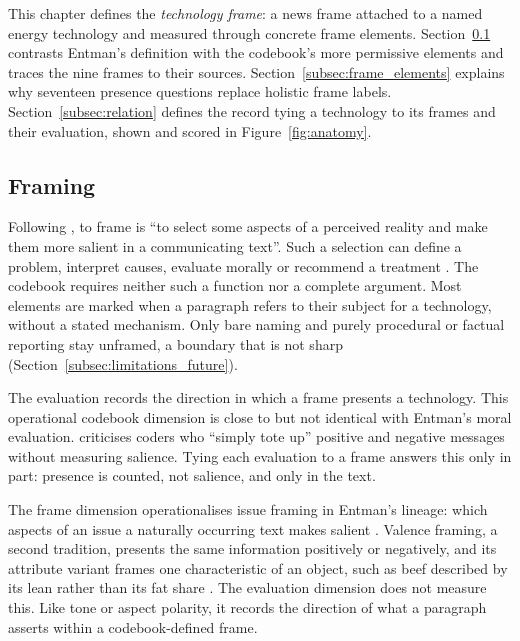 This chapter defines the \emph{technology frame}: a news frame attached to a named energy technology and measured through concrete frame elements. Section~\ref{subsec:framing} contrasts Entman's definition with the codebook's more permissive elements and traces the nine frames to their sources. Section~\ref{subsec:frame_elements} explains why seventeen presence questions replace holistic frame labels. Section~\ref{subsec:relation} defines the record tying a technology to its frames and their evaluation, shown and scored in Figure~\ref{fig:anatomy}.

\subsection{Framing}\label{subsec:framing}

Following \textcite[p.~52]{entman1993framing}, to frame is \enquote{to select some aspects of a perceived reality and make them more salient in a communicating text}. Such a selection can define a problem, interpret causes, evaluate morally or recommend a treatment \parencite[p.~52]{entman1993framing}. The codebook requires neither such a function nor a complete argument. Most elements are marked when a paragraph refers to their subject for a technology, without a stated mechanism. Only bare naming and purely procedural or factual reporting stay unframed, a boundary that is not sharp (Section~\ref{subsec:limitations_future}).

The evaluation records the direction in which a frame presents a technology. This operational codebook dimension is close to but not identical with Entman's moral evaluation. \textcite[p.~57]{entman1993framing} criticises coders who \enquote{simply tote up} positive and negative messages without measuring salience. Tying each evaluation to a frame answers this only in part: presence is counted, not salience, and only in the text.

The frame dimension operationalises issue framing in Entman's lineage: which aspects of an issue a naturally occurring text makes salient \parencite{card2015mediaframes}. Valence framing, a second tradition, presents the same information positively or negatively, and its attribute variant frames one characteristic of an object, such as beef described by its lean rather than its fat share \parencite[pp.~158--159]{levin1998allframes}. The evaluation dimension does not measure this. Like tone or aspect polarity, it records the direction of what a paragraph asserts within a codebook-defined frame.

